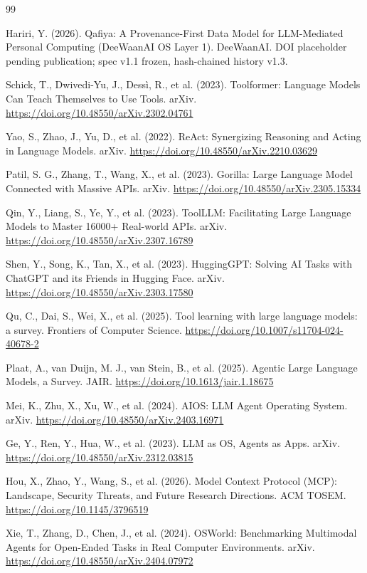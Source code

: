 \documentclass[11pt]{article}
\begin{document}
\begin{thebibliography}{99}

 Hariri, Y. (2026). Qafiya: A Provenance-First Data Model for
LLM-Mediated Personal Computing (DeeWaanAI OS Layer 1). DeeWaanAI. DOI
placeholder pending publication; spec v1.1 frozen, hash-chained history v1.3.

 Schick, T., Dwivedi-Yu, J., Dessì, R., et al. (2023).
Toolformer: Language Models Can Teach Themselves to Use Tools. arXiv.
\url{https://doi.org/10.48550/arXiv.2302.04761}

 Yao, S., Zhao, J., Yu, D., et al. (2022). ReAct: Synergizing
Reasoning and Acting in Language Models. arXiv.
\url{https://doi.org/10.48550/arXiv.2210.03629}

 Patil, S. G., Zhang, T., Wang, X., et al. (2023). Gorilla:
Large Language Model Connected with Massive APIs. arXiv.
\url{https://doi.org/10.48550/arXiv.2305.15334}

 Qin, Y., Liang, S., Ye, Y., et al. (2023). ToolLLM:
Facilitating Large Language Models to Master 16000+ Real-world APIs. arXiv.
\url{https://doi.org/10.48550/arXiv.2307.16789}

 Shen, Y., Song, K., Tan, X., et al. (2023). HuggingGPT:
Solving AI Tasks with ChatGPT and its Friends in Hugging Face. arXiv.
\url{https://doi.org/10.48550/arXiv.2303.17580}

 Qu, C., Dai, S., Wei, X., et al. (2025). Tool learning with
large language models: a survey. Frontiers of Computer Science.
\url{https://doi.org/10.1007/s11704-024-40678-2}

 Plaat, A., van Duijn, M. J., van Stein, B., et al.
(2025). Agentic Large Language Models, a Survey. JAIR.
\url{https://doi.org/10.1613/jair.1.18675}

 Mei, K., Zhu, X., Xu, W., et al. (2024). AIOS: LLM Agent
Operating System. arXiv. \url{https://doi.org/10.48550/arXiv.2403.16971}

 Ge, Y., Ren, Y., Hua, W., et al. (2023). LLM as OS, Agents as
Apps. arXiv. \url{https://doi.org/10.48550/arXiv.2312.03815}

 Hou, X., Zhao, Y., Wang, S., et al. (2026). Model Context
Protocol (MCP): Landscape, Security Threats, and Future Research Directions.
ACM TOSEM. \url{https://doi.org/10.1145/3796519}

 Xie, T., Zhang, D., Chen, J., et al. (2024). OSWorld:
Benchmarking Multimodal Agents for Open-Ended Tasks in Real Computer
Environments. arXiv. \url{https://doi.org/10.48550/arXiv.2404.07972}


\end{thebibliography}
\end{document}
